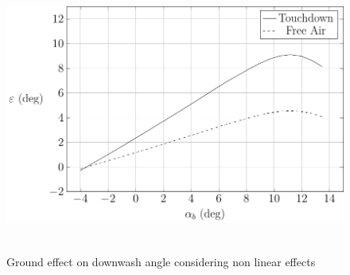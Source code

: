 \begin{figure}[H]
	\includegraphics[height=9cm, keepaspectratio ]{Immagini/Capitolo3/3_4-GroundEffectOnDownwashAngleConsideringNonLinearEffects} 
	\caption{Ground effect on downwash angle considering non linear effects} %
	\label{fig:figura3_4} %
\end{figure}